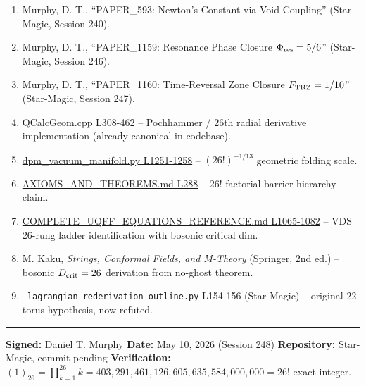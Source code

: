 \documentclass[
]{article}
\providecommand{\tightlist}{%
  \setlength{\itemsep}{0pt}\setlength{\parskip}{0pt}}
\begin{document}
\begin{enumerate}
\def\labelenumi{\arabic{enumi}.}
\tightlist
\item
  Murphy, D. T., ``PAPER\_593: Newton's Constant via Void Coupling''
  (Star-Magic, Session 240).
\item
  Murphy, D. T., ``PAPER\_1159: Resonance Phase Closure
  \(\Phi_{\rm res}=5/6\)'' (Star-Magic, Session 246).
\item
  Murphy, D. T., ``PAPER\_1160: Time-Reversal Zone Closure
  \(F_{\rm TRZ}=1/10\)'' (Star-Magic, Session 247).
\item
  \href{QCalcGeom.cpp\#L308}{QCalcGeom.cpp L308-462} -- Pochhammer /
  26th radial derivative implementation (already canonical in codebase).
\item
  \href{dpm_vacuum_manifold.py\#L1251}{dpm\_vacuum\_manifold.py
  L1251-1258} -- \((26!)^{-1/13}\) geometric folding scale.
\item
  \href{AXIOMS_AND_THEOREMS.md\#L288}{AXIOMS\_AND\_THEOREMS.md L288} --
  \(26!\) factorial-barrier hierarchy claim.
\item
  \href{COMPLETE_UQFF_EQUATIONS_REFERENCE.md\#L1065}{COMPLETE\_UQFF\_EQUATIONS\_REFERENCE.md
  L1065-1082} -- VDS 26-rung ladder identification with bosonic critical
  dim.
\item
  M. Kaku, \emph{Strings, Conformal Fields, and M-Theory} (Springer, 2nd
  ed.) -- bosonic \(D_{\rm crit}=26\) derivation from no-ghost theorem.
\item
  \texttt{\_lagrangian\_rederivation\_outline.py} L154-156 (Star-Magic)
  -- original 22-torus hypothesis, now refuted.
\end{enumerate}

\begin{center}\rule{0.5\linewidth}{0.5pt}\end{center}

\textbf{Signed:} Daniel T. Murphy \textbf{Date:} May 10, 2026 (Session
248) \textbf{Repository:} Star-Magic, commit pending
\textbf{Verification:}
\((1)_{26} = \prod_{k=1}^{26} k = 403{,}291{,}461{,}126{,}605{,}635{,}584{,}000{,}000 = 26!\)
exact integer.




\end{document}
